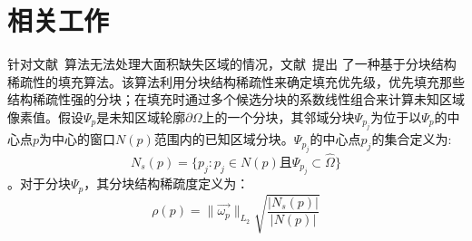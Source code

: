  \section{相关工作}
 \label{ch3:sec:related}
针对文献~算法无法处理大面积缺失区域的情况，文献~\cite{Xu:2010}提出 了一种基于分块结构稀疏性的填充算法。该算法利用分块结构稀疏性来确定填充优先级，优先填充那些结构稀疏性强的分块；在填充时通过多个候选分块的系数线性组合来计算未知区域像素值。假设$\Psi_p$是未知区域轮廓$\partial\Omega$上的一个分块，其邻域分块$\Psi_{p_{j}}$为位于以$\Psi_p$的中心点$p$为中心的窗口$N(p)$范围内的已知区域分块。$\Psi_{p_{j}}$的中心点$p_j$的集合定义为:
$$N_s(p)=\{p_j:p_j \in N(p) 且 \Psi_{p_{j}} \subset \hat{\Omega}\}$$。对于分块$\Psi_p$，其分块结构稀疏度定义为：
\begin{equation}\label{ch3:equ:sparsity}
\rho(p)=\|\vec{\omega_p}\|_{L_2}\sqrt{\frac{|N_s(p)|}{|N(p)|}}
\end{equation}

